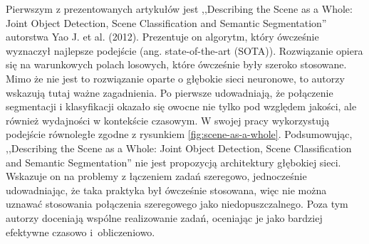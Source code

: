 \vspace{0.5cm}

Pierwszym z prezentowanych artykułów jest ,,Describing the Scene as a Whole: Joint Object Detection, Scene Classification and Semantic Segmentation'' autorstwa Yao J. et al. (2012)\cite{yao2012describing}. Prezentuje on algorytm, który ówcześnie wyznaczył najlepsze podejście (ang. state-of-the-art (SOTA)). Rozwiązanie opiera się na warunkowych polach losowych, które ówcześnie były szeroko stosowane. Mimo że nie jest to rozwiązanie oparte o głębokie sieci neuronowe, to autorzy wskazują tutaj ważne zagadnienia. Po pierwsze udowadniają, że połączenie segmentacji i klasyfikacji okazało się owocne nie tylko pod względem jakości, ale również wydajności w kontekście czasowym. W swojej pracy wykorzystują podejście równoległe zgodne z rysunkiem \ref{fig:scene-as-a-whole}. Podsumowując, ,,Describing the Scene as a Whole: Joint Object Detection, Scene Classification and Semantic Segmentation'' nie jest propozycją architektury głębokiej sieci. Wskazuje on na problemy z łączeniem zadań szeregowo, jednocześnie udowadniając, że taka praktyka był ówcześnie stosowana, więc nie można uznawać stosowania połączenia szeregowego jako niedopuszczalnego. Poza tym autorzy doceniają wspólne realizowanie zadań, oceniając je jako bardziej efektywne czasowo i~obliczeniowo.

